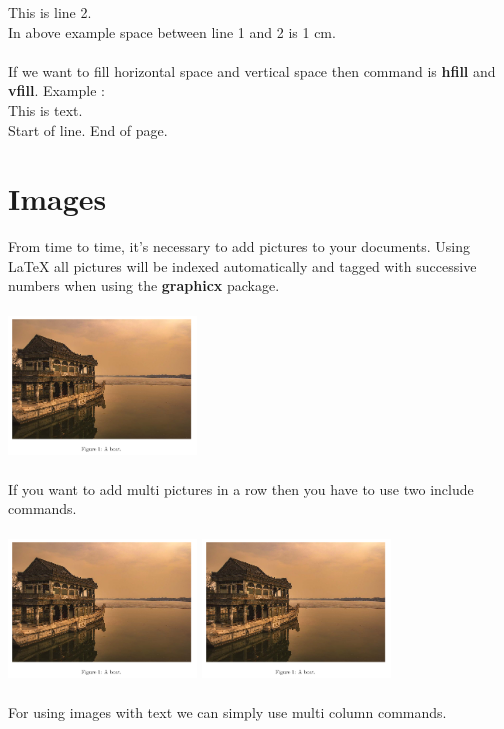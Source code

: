 \documentclass{article}
\begin{document}
\vspace{1cm}

This is line 2.\\
In above example space between line 1 and 2 is 1 cm.\\\\
If we want to fill horizontal space and vertical space then command is \textbf{hfill} and 	\textbf{vfill}. Example :\\
This is \hfill text.\\
Start of line.
\vfill
End of page.

\newpage

\section{Images}
From time to time, it's necessary to add pictures to your documents. Using LaTeX all pictures will be indexed automatically and tagged with successive numbers when using the \textbf{graphicx} package.
\begin{center}
\includegraphics[width=5cm,height=4cm]{boat.png}
\end{center}
If you want to add multi pictures in a row then you have to use two include commands.
\begin{center}
	\includegraphics[width=5cm,height=4cm]{boat.png}
	\includegraphics[width=5cm,height=4cm]{boat.png}
\end{center}
For using images with text we can simply use multi column commands.\\
\end{document}
